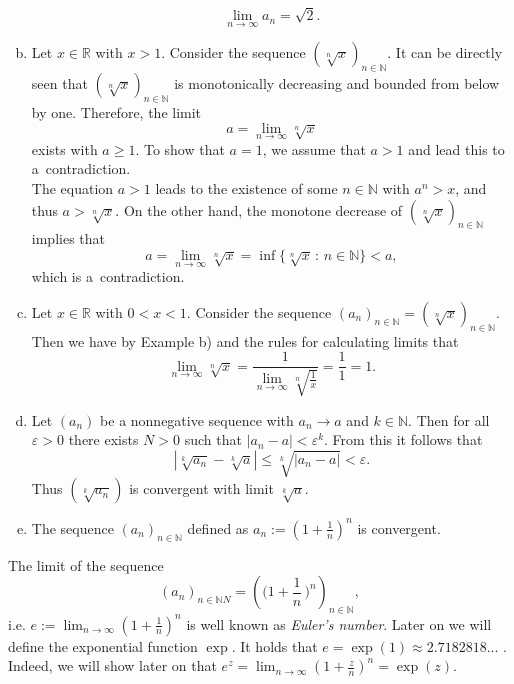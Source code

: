\begin{example}{}
\begin{enumerate}[a)]
\[\lim_{n\to\infty}a_n=\sqrt{2}.\]
\item Let $x\in\mathbb{R}$ with $x>1$. Consider the sequence $(\sqrt[n]{x})_{n\in\mathbb{N}}$. It can be directly seen that $(\sqrt[n]{x})_{n\in\mathbb{N}}$ is monotonically decreasing and bounded from below by one. Therefore, the limit
\[a=\lim_{n\to\infty}\sqrt[n]{x}\]
exists with $a\geq1$. To show that $a=1$, we assume that $a>1$ and lead this to a~contradiction.\\
         The equation $a>1$ leads to the existence of some $n\in\mathbb{N}$ with $a^n>x$, and thus $a>\sqrt[n]{x}$. On the other hand, the monotone decrease of $(\sqrt[n]{x})_{n\in\mathbb{N}}$ implies that
\[a=\lim_{n	\to \infty}\sqrt[n]{x}=\inf\{\sqrt[n]{x}\,:\,n\in\mathbb{N}\}<a,\]
which is a~contradiction.
\item Let $x\in\mathbb{R}$ with $0< x<1$. Consider the sequence $(a_n)_{n\in\mathbb{N}}=(\sqrt[n]{x})_{n\in\mathbb{N}}$. Then we have by Example b) and the rules for calculating limits that
\[\lim_{n\to\infty}\sqrt[n]{x}=\frac1{\lim_{n\to\infty}\sqrt[n]{\frac1x}}=\frac11=1.\]
\item Let $(a_{n})$ be a nonnegative sequence with $a_{n}\rightarrow a$ and $k\in\mathbb{N}$. Then for all $\varepsilon>0$ there exists $N>0$ such that $|a_{n}-a|<\varepsilon^{k}$. From this it follows that
$$
|\sqrt[k]{a_{n}}-\sqrt[k]{a}|\leq \sqrt[k]{|a_{n}-a|}<\varepsilon.
$$
Thus $(\sqrt[k]{a_{n}})$ is convergent with limit $\sqrt[k]{a}$.\\
\item The sequence $(a_{n})_{n\in\mathbb{N}}$ defined as $a_{n} := \left(1+\frac{1}{n}\right)^{n}$ is convergent.\\
\end{enumerate}
\end{example}

\begin{Remark}{}
The limit of the sequence \[(a_n)_{n \in \mathbb{N}N} = \left(  \Big(1+\frac{1}{n} \,\Big)^{n}\right)_{n \in \mathbb{N}},\] 
i.e. $e:=\lim_{n\rightarrow\infty}\left(1+\frac{1}{n}\right)^{n}$ is well known as \textit{Euler's number}. Later on we will define the exponential function $\exp$. It holds that $e=\exp(1)\approx 2.7182818...$ . Indeed, we will show later on that $e^{z}=\lim_{n\rightarrow\infty}\left(1+\frac{z}{n}\right)^{n}=\exp(z)$.
\end{Remark}

